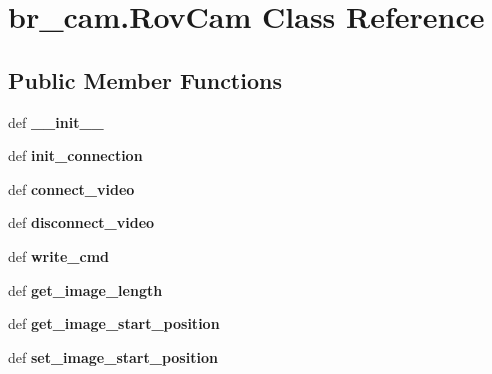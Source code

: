 \hypertarget{classbr__cam_1_1RovCam}{\section{br\-\_\-cam.\-Rov\-Cam Class Reference}
\label{classbr__cam_1_1RovCam}
}
\subsection*{Public Member Functions}
\begin{DoxyCompactItemize}
\item 
\hypertarget{classbr__cam_1_1RovCam_a43f63a31b55b3f792b40f13c3fdff4cc}{def {\bfseries \-\_\-\-\_\-init\-\_\-\-\_\-}}\label{classbr__cam_1_1RovCam_a43f63a31b55b3f792b40f13c3fdff4cc}

\item 
\hypertarget{classbr__cam_1_1RovCam_a4a6afcefbcd074266b2997237f3b736e}{def {\bfseries init\-\_\-connection}}\label{classbr__cam_1_1RovCam_a4a6afcefbcd074266b2997237f3b736e}

\item 
\hypertarget{classbr__cam_1_1RovCam_adbf2f74cdba1160d199d1eb2c20a27d2}{def {\bfseries connect\-\_\-video}}\label{classbr__cam_1_1RovCam_adbf2f74cdba1160d199d1eb2c20a27d2}

\item 
\hypertarget{classbr__cam_1_1RovCam_a30399aab1e552166a340431d29075d3f}{def {\bfseries disconnect\-\_\-video}}\label{classbr__cam_1_1RovCam_a30399aab1e552166a340431d29075d3f}

\item 
\hypertarget{classbr__cam_1_1RovCam_ad6c70f9aec1b47cb78292488f967d0f1}{def {\bfseries write\-\_\-cmd}}\label{classbr__cam_1_1RovCam_ad6c70f9aec1b47cb78292488f967d0f1}

\item 
\hypertarget{classbr__cam_1_1RovCam_aa2650009d6121d3e473d9b040a58045f}{def {\bfseries get\-\_\-image\-\_\-length}}\label{classbr__cam_1_1RovCam_aa2650009d6121d3e473d9b040a58045f}

\item 
\hypertarget{classbr__cam_1_1RovCam_aabafa5394faaa89f714199702dcef0bd}{def {\bfseries get\-\_\-image\-\_\-start\-\_\-position}}\label{classbr__cam_1_1RovCam_aabafa5394faaa89f714199702dcef0bd}

\item 
\hypertarget{classbr__cam_1_1RovCam_ab5b96f6e2274818170a7efaac1c41c31}{def {\bfseries set\-\_\-image\-\_\-start\-\_\-position}}\label{classbr__cam_1_1RovCam_ab5b96f6e2274818170a7efaac1c41c31}


\end{DoxyCompactItemize}

